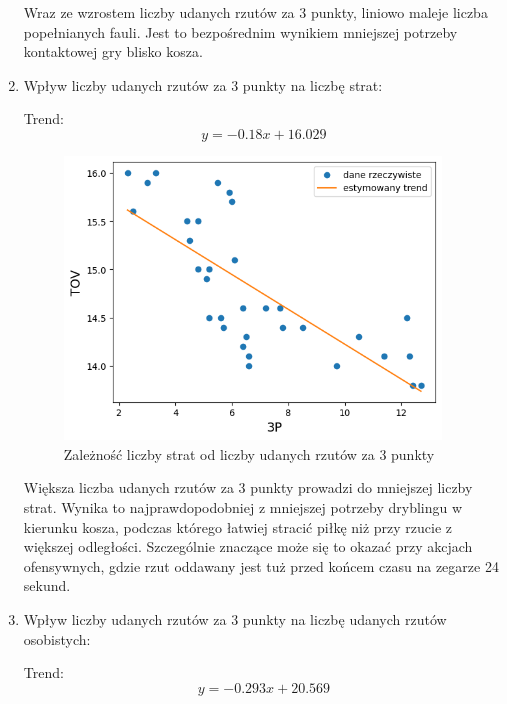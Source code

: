 \documentclass{article}
\begin{document}
\begin{enumerate}
        Wraz ze wzrostem liczby udanych rzutów za 3 punkty, liniowo maleje liczba popełnianych fauli. Jest to bezpośrednim wynikiem mniejszej potrzeby kontaktowej gry blisko kosza. 

        \newpage 
        \item Wpływ liczby udanych rzutów za 3 punkty na liczbę strat:
        
        
        Trend:\begin{equation} y = - 0.18x + 16.029 \end{equation}
        
            \begin{figure}[H]
                \centering
                \includegraphics[width=10cm]{wykres_zaleznosci_TOV_od_3P.png}
                \caption{Zależność liczby strat od liczby udanych rzutów za 3 punkty}
                \label{fig:wykres_zaleznosci_TOV_od_3P}
            \end{figure}

        Większa liczba udanych rzutów za 3 punkty prowadzi do mniejszej liczby strat. Wynika to najprawdopodobniej z mniejszej potrzeby dryblingu w kierunku kosza, podczas którego łatwiej stracić piłkę niż przy rzucie z większej odległości. Szczególnie znaczące może się to okazać przy akcjach ofensywnych, gdzie rzut oddawany jest tuż przed końcem czasu na zegarze 24 sekund.

        \newpage 
        \item Wpływ liczby udanych rzutów za 3 punkty na liczbę udanych rzutów osobistych:
        
        
        Trend:\begin{equation} y = -0.293x + 20.569 \end{equation}
        

\end{enumerate}
\end{document}
